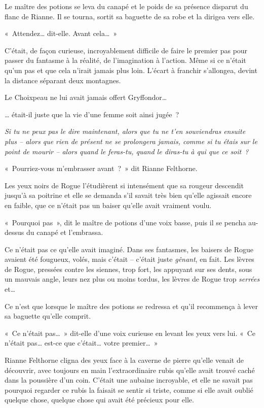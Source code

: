 Le maître des potions se leva du canapé et le poids de sa présence disparut du flanc de Rianne. Il se tourna, sortit sa baguette de sa robe et la dirigea vers elle.

«~Attendez… dit-elle. Avant cela…~»

C'était, de façon curieuse, incroyablement difficile de faire le premier pas pour passer du fantasme à la réalité, de l'imagination à l'action. Même si ce n'était qu'un pas et que cela n'irait jamais plus loin. L'écart à franchir s'allongea, devint la distance séparant deux montagnes.

Le Choixpeau ne lui avait jamais offert Gryffondor…

… était-il juste que la vie d'une femme soit ainsi jugée~?

\emph{Si tu ne peux pas le dire maintenant, alors que tu ne t'en souviendras ensuite plus -- alors que rien de présent ne se prolongera jamais, comme si tu étais sur le point de mourir -- alors quand le feras-tu, quand le diras-tu à qui que ce soit~?}

«~Pourriez-vous m'embrasser avant~?~» dit Rianne Felthorne.

Les yeux noirs de Rogue l'étudièrent si intensément que sa rougeur descendit jusqu'à sa poitrine et elle se demanda s'il savait très bien qu'elle agissait encore en faible, que ce n'était pas un baiser qu'elle avait vraiment voulu.

«~Pourquoi pas~», dit le maître de potions d'une voix basse, puis il se pencha au-dessus du canapé et l'embrassa.

Ce n'était pas ce qu'elle avait imaginé. Dans ses fantasmes, les baisers de Rogue avaient été fougueux, volés, mais c'était -- c'était juste \emph{gênant}, en fait. Les lèvres de Rogue, pressées contre les siennes, trop fort, les appuyant sur ses dents, sous un mauvais angle, leurs nez plus ou moins tordus, les lèvres de Rogue trop \emph{serrées} et…

Ce n'est que lorsque le maître des potions se redressa et qu'il recommença à lever sa baguette qu'elle comprit.

«~Ce n'était pas…~» dit-elle d'une voix curieuse en levant les yeux vers lui. «~Ce n'était pas… est-ce que c'était… votre premier…~»

Rianne Felthorne cligna des yeux face à la caverne de pierre qu'elle venait de découvrir, avec toujours en main l'extraordinaire rubis qu'elle avait trouvé caché dans la poussière d'un coin. C'était une aubaine incroyable, et elle ne savait pas pourquoi regarder ce rubis la faisait se sentir si triste, comme si elle avait oublié quelque chose, quelque chose qui avait été précieux pour elle.
